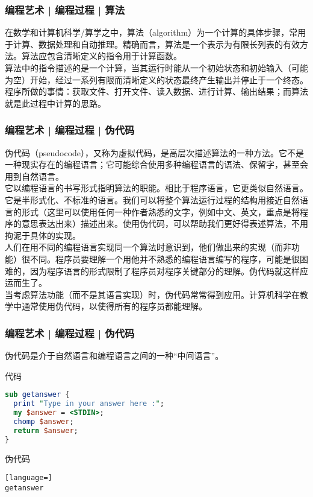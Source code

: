 \begin{frame}
  \frametitle{编程艺术 | 编程过程 | 算法}
  在数学和计算机科学/算学之中，算法（algorithm）为一个计算的具体步骤，常用于计算、数据处理和自动推理。精确而言，算法是一个表示为有限长列表的有效方法。算法应包含清晰定义的指令用于计算函数。\\
  \vspace{1em}
  算法中的指令描述的是一个计算，当其运行时能从一个初始状态和初始输入（可能为空）开始，经过一系列有限而清晰定义的状态最终产生输出并停止于一个终态。\\
  \vspace{1em}
  程序所做的事情：获取文件、打开文件、读入数据、进行计算、输出结果；而算法就是此过程中计算的思路。
\end{frame}

\begin{frame}
  \frametitle{编程艺术 | 编程过程 | 伪代码}
  伪代码（pseudocode），又称为虚拟代码，是高层次描述算法的一种方法。它不是一种现实存在的编程语言；它可能综合使用多种编程语言的语法、保留字，甚至会用到自然语言。\\
  \vspace{1em}
  它以编程语言的书写形式指明算法的职能。相比于程序语言，它更类似自然语言。它是半形式化、不标准的语言。我们可以将整个算法运行过程的结构用接近自然语言的形式（这里可以使用任何一种作者熟悉的文字，例如中文、英文，重点是将程序的意思表达出来）描述出来。使用伪代码，可以帮助我们更好得表述算法，不用拘泥于具体的实现。\\
  \vspace{1em}
  人们在用不同的编程语言实现同一个算法时意识到，他们做出来的实现（而非功能）很不同。程序员要理解一个用他并不熟悉的编程语言编写的程序，可能是很困难的，因为程序语言的形式限制了程序员对程序关键部分的理解。伪代码就这样应运而生了。\\
  \vspace{1em}
  当考虑算法功能（而不是其语言实现）时，伪代码常常得到应用。计算机科学在教学中通常使用伪代码，以使得所有的程序员都能理解。
\end{frame}

\begin{frame}[fragile]
  \frametitle{编程艺术 | 编程过程 | 伪代码}
伪代码是介于自然语言和编程语言之间的一种“中间语言”。
  \begin{block}{代码}
\begin{lstlisting}[language=Perl]
sub getanswer {
  print "Type in your answer here :";  
  my $answer = <STDIN>;
  chomp $answer;
  return $answer;
}
\end{lstlisting}
\end{block}
\pause
\begin{block}{伪代码}
\begin{lstlisting}[language=]
getanswer
\end{lstlisting}
\end{block}
\end{frame}

